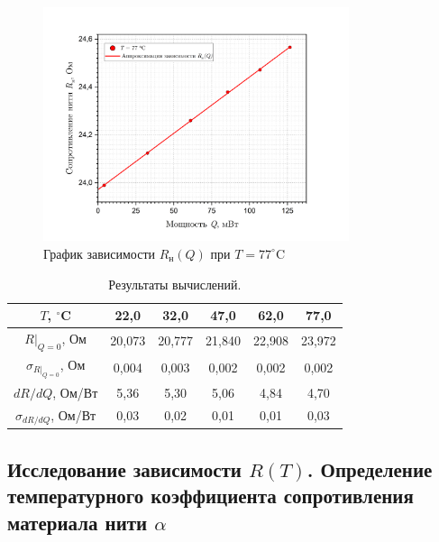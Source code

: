 \documentclass[a4paper, 12pt]{article}
\begin{document}
        \begin{figure}[H]
            \centering
            \includegraphics[width=0.8\textwidth]{images/R(Q)_77.png}
            \caption{График зависимости $R_{\text{н}}(Q)$ при $T = 77 ^\circ$C} 
            \label{graph:R(Q)_77}
        \end{figure}

        \begin{table}[H]
            \centering
            \begin{tabular}{|c|c|c|c|c|c|}
                \hline
                $T$, $^\circ$C            & 22,0   & 32,0   & 47,0   & 62,0   & 77,0  \\ \hline
                $R|_{Q = 0}$, Ом          & 20,073 & 20,777 & 21,840 & 22,908 & 23,972 \\ \hline
                $\sigma_{R|_{Q = 0}}$, Ом & 0,004  & 0,003  & 0,002  & 0,002  & 0,002 \\ \hline
                $dR/dQ$,          Ом/Вт   & 5,36   & 5,30   & 5,06   & 4,84   & 4,70 \\ \hline
                $\sigma_{dR/dQ}$, Ом/Вт   & 0,03   & 0,02   & 0,01   & 0,01   & 0,03 \\ \hline
            \end{tabular}
            \caption{Результаты вычислений.}
            \label{table:results_2}
        \end{table}

        \subsection*{Исследование зависимости $R(T)$. Определение температурного коэффициента сопротивления материала нити $\alpha$}
        
\end{document}
